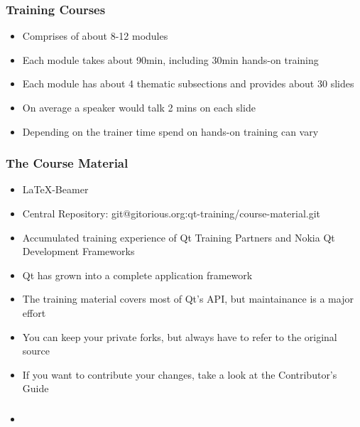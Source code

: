 \begin{slide}
  \frametitle{Training Courses}
  \begin{itemize}
    \item Comprises of about 8-12 modules
    \item Each module takes about 90min, including 30min hands-on training
    \item Each module has about 4 thematic subsections and provides about 30 slides
    \item On average a speaker would talk 2 mins on each slide
    \item Depending on the trainer time spend on hands-on training can vary
  \end{itemize}
\end{slide}

\begin{slide}
  \frametitle{The Course Material}
  \begin{itemize}
    \item \LaTeX-Beamer
    \item Central Repository: git@gitorious.org:qt-training/course-material.git
    \item Accumulated training experience of Qt Training Partners and Nokia Qt Development Frameworks
    \item Qt has grown into a complete application framework
    \item The training material covers most of Qt's API, but maintainance is a major effort
    \item You can keep your private forks, but always have to refer to the original source
    \item If you want to contribute your changes, take a look at the Contributor's Guide
  \end{itemize}
\end{slide}

\begin{slide}
  \frametitle{}
  \begin{itemize}
    \item 
  \end{itemize}
\end{slide}
